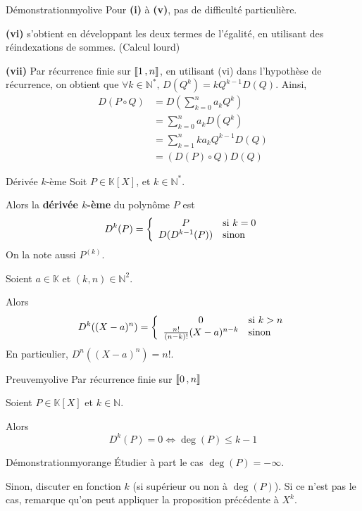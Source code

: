     \begin{demo}{Démonstration}{myolive}
        Pour \textbf{(i)} à \textbf{(v)}, pas de difficulté particulière.
    
        \textbf{(vi)} s’obtient en développant les deux termes de l’égalité, en utilisant des réindexations de sommes. (Calcul lourd)
    
        \textbf{(vii)} Par récurrence finie sur $\left\llbracket 1 \, , n \right\rrbracket$, en utilisant (vi) dans l’hypothèse de récurrence, on obtient que $ \forall k \in \mathbb{N}^*, \, D(Q^k) = k Q^{k-1} D(Q) $. Ainsi, 
        \begin{align*}
            D(P \circ Q) &= D \left(\sum\limits_{k=0}^n a_k Q^k\right) \\
            &= \sum\limits_{k=0}^n a_k D(Q^k) \\
            &= \sum\limits_{k=1}^{n}k a_k Q^{k-1} D(Q) \\
            &= (D(P) \circ Q)D(Q)
        \end{align*}
    \end{demo}

    \begin{defi}{Dérivée $k$-ème}{}
        Soit $P \in \mathbb{K}[X]$, et $k \in \mathbb{N}^*$.
    
        Alors la \textbf{dérivée $k$-ème} du polynôme $P$ est
        \[ D^k(P)= \sisinon{P}{k = 0}{D(D^{k-1}(P))} \] 
        On la note aussi $P^{(k)}$.
    \end{defi}
    
    \begin{prop}{}{}
        Soient $a \in \mathbb{K}$ et $(k,n) \in \mathbb{N}^2$.
    
        Alors 
        \[ D^k((X-a)^n) = \sisinon{0}{k > n}{\frac{n!}{(n-k)!}(X-a)^{n-k}} \]
        En particulier, $D^n((X-a)^n) = n!$.
    \end{prop}
    
    \begin{demo}{Preuve}{myolive}
        Par récurrence finie sur $\left\llbracket 0 \, , n \right\rrbracket$
    \end{demo}
    
    \begin{coro}{}{}
        Soient $P \in \mathbb{K}[X]$ et $k \in \mathbb{N}$.
    
        Alors \[ D^k(P) = 0 \iff \deg(P) \leq k-1 \] 
    \end{coro}
    
    \begin{demo}{Démonstration}{myorange}
        Étudier à part le cas $\deg(P) = -\infty$.
    
        Sinon, discuter en fonction $k$ (si supérieur ou non à $\deg(P)$). Si ce n’est pas le cas, remarque qu’on peut appliquer la proposition précédente à $X^k$.
    \end{demo}
    
